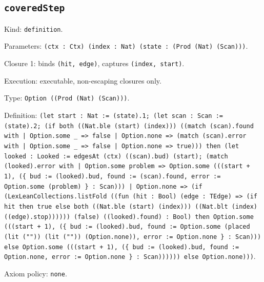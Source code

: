 \documentclass[11pt]{article}
\begin{document}
\subsection*{\texttt{coveredStep}}
\noindent Kind: \texttt{definition}.\par
\noindent Parameters: \texttt{(ctx : Ctx) (index : Nat) (state : (Prod (Nat) (Scan)))}.\par
\noindent Closure 1: binds \texttt{(hit, edge)}, captures \texttt{(index, start)}.\par
\noindent Execution: executable, non-escaping closures only.\par
\noindent Type: \texttt{Option ((Prod (Nat) (Scan)))}.\par
\noindent Definition: \texttt{(let start : Nat := (state).1; (let scan : Scan := (state).2; (if both ((Nat.ble (start) (index))) ((match (scan).found with | Option.some \_ => false | Option.none => (match (scan).error with | Option.some \_ => false | Option.none => true))) then (let looked : Looked := edgesAt (ctx) ((scan).bud) (start); (match (looked).error with | Option.some problem => Option.some (((start + 1), (\{ bud := (looked).bud, found := (scan).found, error := Option.some (problem) \} : Scan))) | Option.none => (if (LexLeanCollections.listFold ((fun (hit : Bool) (edge : TEdge) => (if hit then true else both ((Nat.ble (start) (index))) ((Nat.blt (index) ((edge).stop)))))) (false) ((looked).found) : Bool) then Option.some (((start + 1), (\{ bud := (looked).bud, found := Option.some (placed (lit ("")) (lit ("")) (Option.none)), error := Option.none \} : Scan))) else Option.some (((start + 1), (\{ bud := (looked).bud, found := Option.none, error := Option.none \} : Scan)))))) else Option.none)))}.\par
\noindent Axiom policy: \texttt{none}.\par
\end{document}

